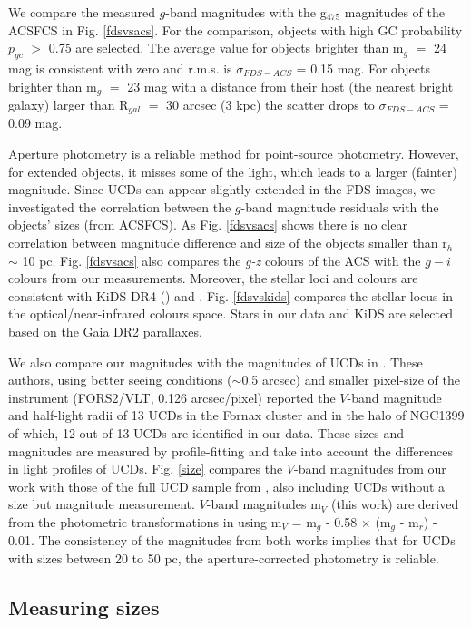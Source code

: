 \documentclass[fleqn,usenatbib]{mnras}
\begin{document}
We compare the measured $g$-band magnitudes with the g$_{475}$ magnitudes of the ACSFCS in Fig. \ref{fdsvsacs}. For the comparison, objects with high GC probability $p_{gc}$ $>$ 0.75 are selected. The average value for objects brighter than m$_g$ $=$ 24 mag is consistent with zero and r.m.s. is $\sigma_{FDS-ACS}$ = 0.15 mag. For objects brighter than m$_g$ $=$ 23 mag with a distance from their host (the nearest bright galaxy) larger than R$_{gal}$ $=$ 30 arcsec (3 kpc) the scatter drops to $\sigma_{FDS-ACS}$ = 0.09 mag. 

Aperture photometry is a reliable method for point-source photometry. However, for extended objects, it misses some of the light, which leads to a larger (fainter) magnitude. Since UCDs can appear slightly extended in the FDS images, we investigated the correlation between the $g$-band magnitude residuals with the objects' sizes (from ACSFCS). As Fig. \ref{fdsvsacs} shows there is no clear correlation between magnitude difference and size of the objects smaller than r$_h$ $\sim$ 10 pc. Fig. \ref{fdsvsacs} also compares the \textit{g-z} colours of the ACS with the $g-i$ colours from our measurements. Moreover, the stellar loci and colours are consistent with KiDS DR4 (\citealp{kids-dr4}) and \citet{covey}. Fig. \ref{fdsvskids} compares the stellar locus in the optical/near-infrared colours space. Stars in our data and KiDS are selected based on the Gaia DR2 parallaxes.

We also compare our magnitudes with the magnitudes of UCDs in \citet{voggel-2016}. These authors, using better seeing conditions ($\sim$0.5 arcsec) and smaller pixel-size of the instrument (FORS2/VLT, 0.126 arcsec/pixel) reported the $V$-band magnitude and half-light radii of 13 UCDs in the Fornax cluster and in the halo of NGC1399 of which, 12 out of 13 UCDs are identified in our data. These sizes and magnitudes are measured by profile-fitting and take into account the differences in light profiles of UCDs. Fig. \ref{size} compares the $V$-band magnitudes from our work with those of the full UCD sample from \citet{voggel-2016}, also including UCDs without a size but magnitude measurement. $V$-band magnitudes m$_V$ (this work) are derived from the photometric transformations in \citet{jester2005} using m$_V$ = m$_g$ - 0.58 $\times$ (m$_g$ - m$_r$) - 0.01. The consistency of the magnitudes from both works implies that for UCDs with sizes between 20 to 50 pc, the aperture-corrected photometry is reliable.


\subsection{Measuring sizes}
\end{document}
